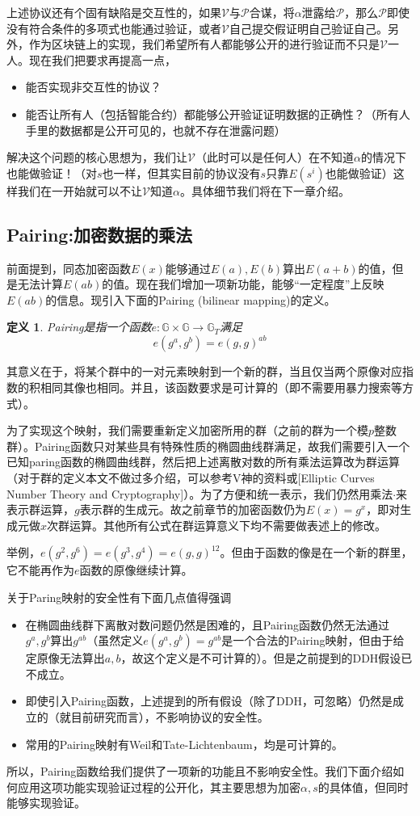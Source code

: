 \documentclass[12pt]{article}
\newcommand{\pp}{$\mathcal{P}$}
\newcommand{\vv}{$\mathcal{V}$}
\newtheorem{definition}{定义}
\begin{document}
上述协议还有个固有缺陷是交互性的，如果\vv 与\pp 合谋，将$\alpha$泄露给\pp，那么\pp 即使没有符合条件的多项式也能通过验证，或者\vv 自己提交假证明自己验证自己。另外，作为区块链上的实现，我们希望所有人都能够公开的进行验证而不只是\vv 一人。现在我们把要求再提高一点，
\begin{itemize}
    \item 能否实现非交互性的协议？
    \item 能否让所有人（包括智能合约）都能够公开验证证明数据的正确性？（所有人手里的数据都是公开可见的，也就不存在泄露问题）
\end{itemize}
解决这个问题的核心思想为，我们让\vv （此时可以是任何人）在不知道$\alpha$的情况下也能做验证！（对$s$也一样，但其实目前的协议没有$s$只靠$E(s^i)$也能做验证）这样我们在一开始就可以不让\vv 知道$\alpha$。具体细节我们将在下一章介绍。
\subsection{Pairing:加密数据的乘法}
前面提到，同态加密函数$E(x)$能够通过$E(a),E(b)$算出$E(a+b)$的值，但是无法计算$E(ab)$的值。现在我们增加一项新功能，能够“一定程度”上反映$E(ab)$的信息。现引入下面的Pairing (bilinear mapping)的定义。
\begin{definition}
	Pairing是指一个函数$e: \mathbb{G}\times \mathbb{G} \rightarrow \mathbb{G}_T$满足
	$$e(g^a,g^b) = e(g,g)^{ab}$$
\end{definition}
其意义在于，将某个群中的一对元素映射到一个新的群，当且仅当两个原像对应指数的积相同其像也相同。并且，该函数要求是可计算的（即不需要用暴力搜索等方式）。

为了实现这个映射，我们需要重新定义加密所用的群（之前的群为一个模$p$整数群）。Pairing函数只对某些具有特殊性质的椭圆曲线群满足，故我们需要引入一个已知paring函数的椭圆曲线群，然后把上述离散对数的所有乘法运算改为群运算（对于群的定义本文不做过多介绍，可以参考V神的资料或[Elliptic Curves Number Theory and Cryptography]）。为了方便和统一表示，我们仍然用乘法$\cdot$来表示群运算，$g$表示群的生成元。故之前章节的加密函数仍为$E(x)=g^x$，即对生成元做$x$次群运算。其他所有公式在群运算意义下均不需要做表述上的修改。

举例，$e(g^2,g^6)=e(g^3,g^4)=e(g,g)^{12}$。但由于函数的像是在一个新的群里，它不能再作为$e$函数的原像继续计算。

关于Paring映射的安全性有下面几点值得强调
\begin{itemize}
	\item 在椭圆曲线群下离散对数问题仍然是困难的，且Pairing函数仍然无法通过$g^{a},g^b$算出$g^{ab}$（虽然定义$e(g^a,g^b)=g^{ab}$是一个合法的Pairing映射，但由于给定原像无法算出$a,b$，故这个定义是不可计算的）。但是之前提到的DDH假设已不成立。
	\item 即使引入Pairing函数，上述提到的所有假设（除了DDH，可忽略）仍然是成立的（就目前研究而言），不影响协议的安全性。
	\item 常用的Pairing映射有Weil和Tate-Lichtenbaum，均是可计算的。
\end{itemize}
所以，Pairing函数给我们提供了一项新的功能且不影响安全性。我们下面介绍如何应用这项功能实现验证过程的公开化，其主要思想为加密$\alpha,s$的具体值，但同时能够实现验证。
\end{document}
